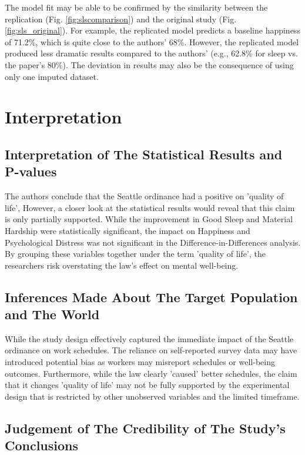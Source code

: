 \documentclass{article}
\begin{document}
	The model fit may be able to be confirmed by the similarity between the replication (Fig. \ref{fig:slscomparison}) and the original study (Fig. \ref{fig:sls_original}). For example, the replicated model predicts a baseline happiness of 71.2\%, which is quite close to the authors' 68\%. However, the replicated model produced less dramatic results compared to the authors' (e.g., 62.8\% for sleep vs. the paper's 80\%). The deviation in results may also be the consequence of using only one imputed dataset.
	
	\section{Interpretation}
	\subsection{Interpretation of The Statistical Results and P-values}
	
	The authors conclude that the Seattle ordinance had a positive on 'quality of life', However, a closer look at the statistical results would reveal that this claim is only partially supported. While the improvement in Good Sleep and Material Hardship were statistically significant, the impact on Happiness and Psychological Distress was not significant in the Difference-in-Differences analysis. By grouping these variables together under the term 'quality of life', the researchers risk overstating the law's effect on mental well-being.
	
	\subsection{Inferences Made About The Target Population and The World}
	
	While the study design effectively captured the immediate impact of the Seattle ordinance on work schedules. The reliance on self-reported survey data may have introduced potential bias as workers may misreport schedules or well-being outcomes. Furthermore, while the law clearly 'caused' better schedules, the claim that it changes 'quality of life' may not be fully supported by the experimental design that is restricted by other unobserved variables and the limited timeframe.
	
	\subsection{Judgement of The Credibility of The Study's Conclusions}
	
\end{document}
